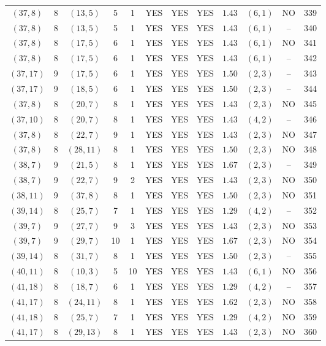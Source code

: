 \begin{longtable}{|c|c|c|c|c|c|c|c|c|c|c|c|}
$(37,8)$ & 8 & $(13,5)$ & 5 & 1 & YES & YES & YES & $1.43$ & $(6,1)$ & NO & 339\\
$(37,8)$ & 8 & $(13,5)$ & 5 & 1 & YES & YES & YES & $1.43$ & $(6,1)$ & -- & 340\\
$(37,8)$ & 8 & $(17,5)$ & 6 & 1 & YES & YES & YES & $1.43$ & $(6,1)$ & NO & 341\\
$(37,8)$ & 8 & $(17,5)$ & 6 & 1 & YES & YES & YES & $1.43$ & $(6,1)$ & -- & 342\\
$(37,17)$ & 9 & $(17,5)$ & 6 & 1 & YES & YES & YES & $1.50$ & $(2,3)$ & -- & 343\\
$(37,17)$ & 9 & $(18,5)$ & 6 & 1 & YES & YES & YES & $1.50$ & $(2,3)$ & -- & 344\\
$(37,8)$ & 8 & $(20,7)$ & 8 & 1 & YES & YES & YES & $1.43$ & $(2,3)$ & NO & 345\\
$(37,10)$ & 8 & $(20,7)$ & 8 & 1 & YES & YES & YES & $1.43$ & $(4,2)$ & -- & 346\\
$(37,8)$ & 8 & $(22,7)$ & 9 & 1 & YES & YES & YES & $1.43$ & $(2,3)$ & NO & 347\\
$(37,8)$ & 8 & $(28,11)$ & 8 & 1 & YES & YES & YES & $1.50$ & $(2,3)$ & NO & 348\\
$(38,7)$ & 9 & $(21,5)$ & 8 & 1 & YES & YES & YES & $1.67$ & $(2,3)$ & -- & 349\\
$(38,7)$ & 9 & $(22,7)$ & 9 & 2 & YES & YES & YES & $1.43$ & $(2,3)$ & NO & 350\\
$(38,11)$ & 9 & $(37,8)$ & 8 & 1 & YES & YES & YES & $1.50$ & $(2,3)$ & NO & 351\\
$(39,14)$ & 8 & $(25,7)$ & 7 & 1 & YES & YES & YES & $1.29$ & $(4,2)$ & -- & 352\\
$(39,7)$ & 9 & $(27,7)$ & 9 & 3 & YES & YES & YES & $1.43$ & $(2,3)$ & NO & 353\\
$(39,7)$ & 9 & $(29,7)$ & 10 & 1 & YES & YES & YES & $1.67$ & $(2,3)$ & NO & 354\\
$(39,14)$ & 8 & $(31,7)$ & 8 & 1 & YES & YES & YES & $1.50$ & $(2,3)$ & -- & 355\\
$(40,11)$ & 8 & $(10,3)$ & 5 & 10 & YES & YES & YES & $1.43$ & $(6,1)$ & NO & 356\\
$(41,18)$ & 8 & $(18,7)$ & 6 & 1 & YES & YES & YES & $1.29$ & $(4,2)$ & -- & 357\\
$(41,17)$ & 8 & $(24,11)$ & 8 & 1 & YES & YES & YES & $1.62$ & $(2,3)$ & NO & 358\\
$(41,18)$ & 8 & $(25,7)$ & 7 & 1 & YES & YES & YES & $1.29$ & $(4,2)$ & NO & 359\\
$(41,17)$ & 8 & $(29,13)$ & 8 & 1 & YES & YES & YES & $1.43$ & $(2,3)$ & NO & 360\\

\end{longtable}
